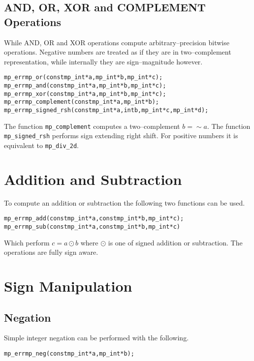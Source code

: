 \documentclass[synpaper]{book}
\begin{document}
\subsection{AND, OR, XOR and COMPLEMENT Operations}

While AND, OR and XOR operations compute arbitrary--precision bitwise operations. Negative numbers
are treated as if they are in two--complement representation, while internally they are
sign--magnitude however.

    
\begin{alltt}
mp_err mp_or  (const mp_int *a, mp_int *b, mp_int *c);
mp_err mp_and (const mp_int *a, mp_int *b, mp_int *c);
mp_err mp_xor (const mp_int *a, mp_int *b, mp_int *c);
mp_err mp_complement(const mp_int *a, mp_int *b);
mp_err mp_signed_rsh(const mp_int *a, int b, mp_int *c, mp_int *d);
\end{alltt}

The function \texttt{mp\_complement} computes a two--complement $b = \sim a$. The function
\texttt{mp\_signed\_rsh} performs sign extending right shift. For positive numbers it is equivalent
to \texttt{mp\_div\_2d}.

\section{Addition and Subtraction}

To compute an addition or subtraction the following two functions can be used.

 
\begin{alltt}
mp_err mp_add (const mp_int *a, const mp_int *b, mp_int *c);
mp_err mp_sub (const mp_int *a, const mp_int *b, mp_int *c)
\end{alltt}

Which perform $c = a \odot b$ where $\odot$ is one of signed addition or subtraction.  The
operations are fully sign aware.

\section{Sign Manipulation}
\subsection{Negation}
\label{sec:NEG}
Simple integer negation can be performed with the following.

\begin{alltt}
mp_err mp_neg (const mp_int *a, mp_int *b);
\end{alltt}
\end{document}
